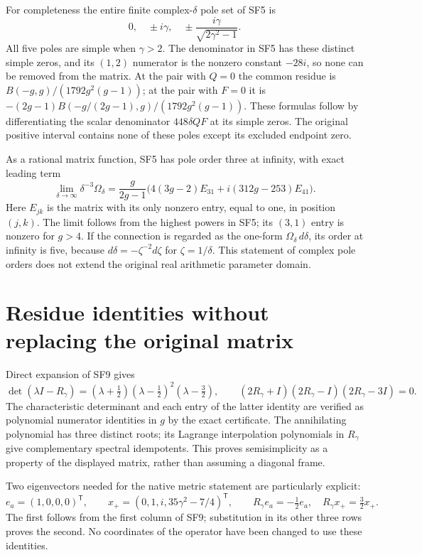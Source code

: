 For completeness the entire finite complex-$\delta$ pole set
of SF5 is
\begin{equation}
 0,\quad\pm i\gamma,\quad
 \pm\frac{i\gamma}{\sqrt{2\gamma^2-1}}.\tag{SF11}
\end{equation}
All five poles are simple when $\gamma>2$. The denominator in
SF5 has these distinct simple zeros, and its $(1,2)$ numerator
is the nonzero constant $-28i$, so none can be removed from the
matrix. At the pair with $Q=0$ the common residue is
$B(-g,g)/(1792g^2(g-1))$; at the pair with $F=0$ it is
$-(2g-1)B(-g/(2g-1),g)/(1792g^2(g-1))$.
These formulas follow by differentiating the scalar denominator
$448\delta QF$ at its simple zeros. The original positive
interval contains none of these poles except its excluded
endpoint zero.

As a rational matrix function, SF5 has pole order three at
infinity, with exact leading term
\[
 \lim_{\delta\to\infty}\delta^{-3}\Omega_\delta
 =\frac{g}{2g-1}\bigl(4(3g-2)E_{31}
                         +i(312g-253)E_{41}\bigr).
\]
Here $E_{jk}$ is the matrix with its only nonzero entry, equal
to one, in position $(j,k)$. The limit follows from the highest
powers in SF5; its $(3,1)$ entry is nonzero for $g>4$.
If the connection is regarded as the one-form
$\Omega_\delta\,d\delta$, its order at infinity is five,
because $d\delta=-\zeta^{-2}d\zeta$ for $\zeta=1/\delta$.
This statement of complex pole orders does not extend the
original real arithmetic parameter domain.

\section{Residue identities without replacing the original matrix}
Direct expansion of SF9 gives
\begin{equation}
 \det(\lambda I-R_\gamma)
   =(\lambda+\tfrac12)(\lambda-\tfrac12)^2(\lambda-\tfrac32),
 \qquad
 (2R_\gamma+I)(2R_\gamma-I)(2R_\gamma-3I)=0.
 \tag{SF12}
\end{equation}
The characteristic determinant and each entry of the latter
identity are verified as polynomial numerator identities in
$g$ by the exact certificate. The annihilating polynomial has
three distinct roots; its Lagrange interpolation polynomials
in $R_\gamma$ give complementary spectral idempotents.
This proves semisimplicity as a property of the displayed
matrix, rather than assuming a diagonal frame.

Two eigenvectors needed for the native metric statement are
particularly explicit:
\begin{equation}
 e_a=(1,0,0,0)^{\mathsf T},\qquad
 x_+=(0,1,i,35\gamma^2-7/4)^{\mathsf T},\qquad
 R_\gamma e_a=-\tfrac12e_a,\quad
 R_\gamma x_+=\tfrac32x_+.
 \tag{SF13}
\end{equation}
The first follows from the first column of SF9; substitution
in its other three rows proves the second. No coordinates of
the operator have been changed to use these identities.


